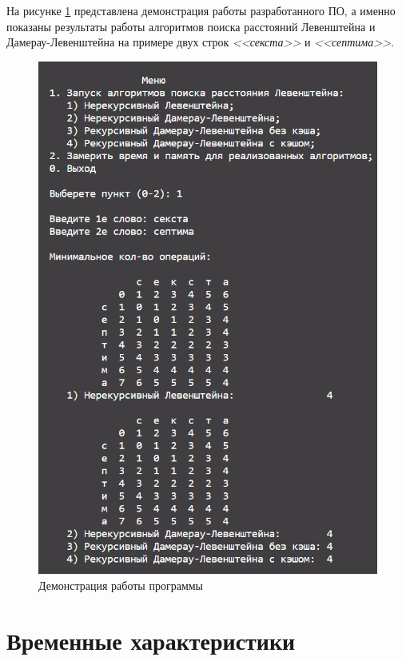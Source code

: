 На рисунке \ref{img:demonstration} представлена демонстрация работы разработанного ПО, а именно показаны результаты работы алгоритмов поиска расстояний Левенштейна и Дамерау-Левенштейна на примере двух строк \textit{<<секста>>} и \textit{<<септима>>}.  
\clearpage
\begin{figure}[h]
	\centering
	\includegraphics[height=0.7\textheight]{img/prog_work.png}
	\caption{Демонстрация работы программы}
	\label{img:demonstration}
\end{figure}

\clearpage

\section{Временные характеристики}


